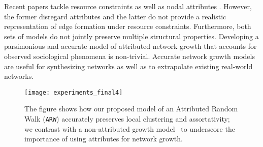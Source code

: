Recent papers tackle resource constraints \cite{mossa2002truncation,zeng2005construction,wang2009local} as well as nodal attributes
\cite{de2013scale,gong2012evolution}. However, the former disregard attributes and the latter do not provide a realistic representation
of edge formation under resource constraints. Furthermore, both sets of models do not jointly preserve multiple structural properties.
Developing a parsimonious and accurate model of attributed network growth that accounts for observed
sociological phenomena is non-trivial. Accurate network growth models are useful
for synthesizing networks as well as to extrapolate existing real-world networks.




\begin{figure}[t]
	\centering
	\texttt{[image: experiments\_final4]}
    \vspace{1pt}
    \caption{The figure shows how our proposed model of an Attributed Random Walk (\texttt{ARW}) accurately preserves local clustering and assortativity; we contrast with a non-attributed growth model~\cite{holme2002growing} to underscore the importance of using attributes for network growth.}
	\label{fig:intro_plot}
\end{figure}



